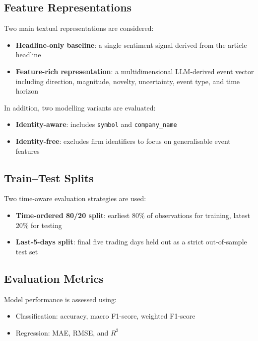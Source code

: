 \subsection{Feature Representations}

Two main textual representations are considered:
\begin{itemize}
    \item \textbf{Headline-only baseline}: a single sentiment signal derived from the article headline
    \item \textbf{Feature-rich representation}: a multidimensional LLM-derived event vector including direction, magnitude, novelty, uncertainty, event type, and time horizon
\end{itemize}

In addition, two modelling variants are evaluated:
\begin{itemize}
    \item \textbf{Identity-aware}: includes \texttt{symbol} and \texttt{company\_name}
    \item \textbf{Identity-free}: excludes firm identifiers to focus on generalisable event features
\end{itemize}

\subsection{Train--Test Splits}

Two time-aware evaluation strategies are used:
\begin{itemize}
    \item \textbf{Time-ordered 80/20 split}: earliest 80\% of observations for training, latest 20\% for testing
    \item \textbf{Last-5-days split}: final five trading days held out as a strict out-of-sample test set
\end{itemize}

\subsection{Evaluation Metrics}

Model performance is assessed using:
\begin{itemize}
    \item Classification: accuracy, macro F1-score, weighted F1-score
    \item Regression: MAE, RMSE, and $R^2$
\end{itemize}

